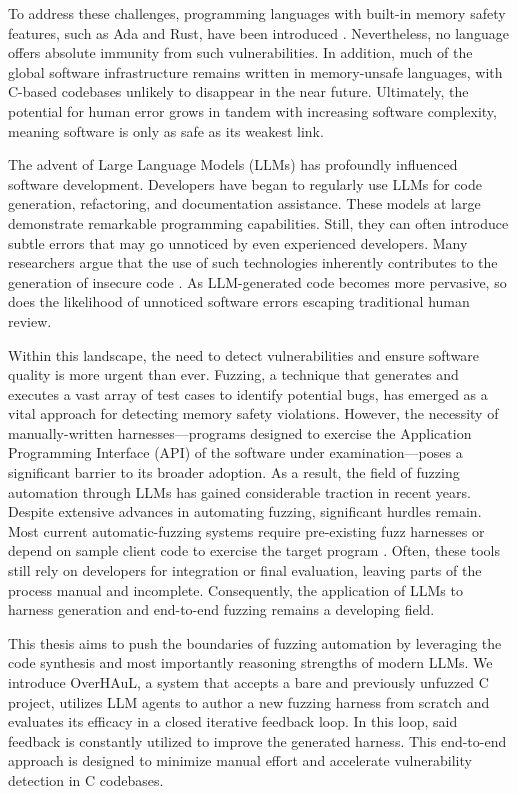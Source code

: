 \documentclass[
  a4paper,
]{scrreprt}
\theoremstyle{definition}
\theoremstyle{remark}
\begin{document}
To address these challenges, programming languages with built-in memory
safety features, such as Ada and Rust, have been introduced
\autocite{adadevelopers2022,rustprojectdevelopers2025}. Nevertheless, no
language offers absolute immunity from such vulnerabilities. In
addition, much of the global software infrastructure remains written in
memory-unsafe languages, with C-based codebases unlikely to disappear in
the near future. Ultimately, the potential for human error grows in
tandem with increasing software complexity, meaning software is only as
safe as its weakest link.

The advent of Large Language Models (LLMs) has profoundly influenced
software development. Developers have began to regularly use LLMs for
code generation, refactoring, and documentation assistance. These models
at large demonstrate remarkable programming capabilities. Still, they
can often introduce subtle errors that may go unnoticed by even
experienced developers. Many researchers argue that the use of such
technologies inherently contributes to the generation of insecure code
\autocite{perry2023,kosmyna2025,lee2025}. As LLM-generated code becomes
more pervasive, so does the likelihood of unnoticed software errors
escaping traditional human review.

Within this landscape, the need to detect vulnerabilities and ensure
software quality is more urgent than ever. Fuzzing, a technique that
generates and executes a vast array of test cases to identify potential
bugs, has emerged as a vital approach for detecting memory safety
violations. However, the necessity of manually-written
harnesses---programs designed to exercise the Application Programming
Interface (API) of the software under examination---poses a significant
barrier to its broader adoption. As a result, the field of fuzzing
automation through LLMs has gained considerable traction in recent
years. Despite extensive advances in automating fuzzing, significant
hurdles remain. Most current automatic-fuzzing systems require
pre-existing fuzz harnesses \autocite{oss-fuzz-gen} or depend on sample
client code to exercise the target program
\autocite{utopia,fuzzgen,fudge}. Often, these tools still rely on
developers for integration or final evaluation, leaving parts of the
process manual and incomplete. Consequently, the application of LLMs to
harness generation and end-to-end fuzzing remains a developing field.

This thesis aims to push the boundaries of fuzzing automation by
leveraging the code synthesis and most importantly reasoning strengths
of modern LLMs. We introduce OverHAuL, a system that accepts a bare and
previously unfuzzed C project, utilizes LLM agents to author a new
fuzzing harness from scratch and evaluates its efficacy in a closed
iterative feedback loop. In this loop, said feedback is constantly
utilized to improve the generated harness. This end-to-end approach is
designed to minimize manual effort and accelerate vulnerability
detection in C codebases.
\end{document}
